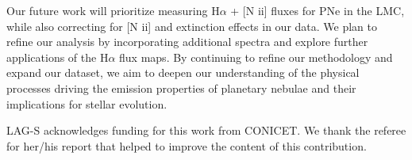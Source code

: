 \documentclass[baaa]{baaa}
\begin{document}
Our future work will prioritize measuring H$\alpha$ + [N {\sc ii}] fluxes for PNe in the LMC, while also correcting for [N {\sc ii}] and extinction effects in our data. We plan to refine our analysis by incorporating additional spectra and explore further applications of the H$\alpha$ flux maps. By continuing to refine our methodology and expand our dataset, we aim to deepen our understanding of the physical processes driving the emission properties of planetary nebulae and their implications for stellar evolution.

\begin{acknowledgement}
LAG-S acknowledges funding for this work from CONICET. We thank the referee for her/his report that helped to improve the content of this contribution.
\end{acknowledgement}



\small

\end{document}
